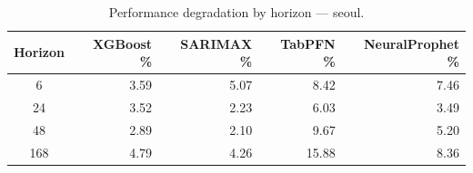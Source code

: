 \begin{table}[h]
\centering
\caption{Performance degradation by horizon — seoul.}
\label{tab:degradation_horizon_seoul}
\begin{tabular}{crrrr}
\toprule
Horizon & XGBoost \% & SARIMAX \% & TabPFN \% & NeuralProphet \% \\
\midrule
6 & 3.59 & 5.07 & 8.42 & 7.46 \\
24 & 3.52 & 2.23 & 6.03 & 3.49 \\
48 & 2.89 & 2.10 & 9.67 & 5.20 \\
168 & 4.79 & 4.26 & 15.88 & 8.36 \\
\bottomrule
\end{tabular}
\end{table}
